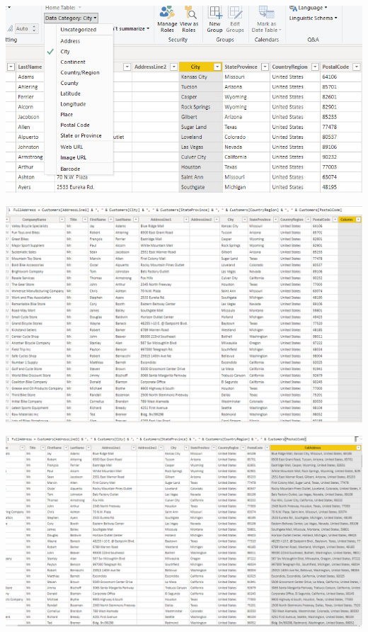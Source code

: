 \documentclass[12pt,letterpaper]{article}
\begin{document}
\begin{center}
\includegraphics[width=16cm]{images/44}\newline
\end{center}
\begin{center}
\includegraphics[width=16cm]{images/55}\newline
\end{center}
\begin{center}
\includegraphics[width=16cm]{images/66}\newline
\end{center}
\end{document}
